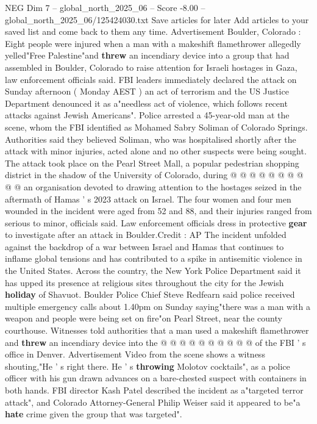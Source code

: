 \begin{textsample}{NEG Dim 7 – global\_north\_2025\_06 – Score -8.00 – global\_north\_2025\_06/125424030.txt}  \label{ex:f7_neg_080}
Save articles for later Add articles to your saved list and come back to them any time.
Advertisement Boulder, Colorado : Eight people were injured when a man with a makeshift flamethrower allegedly yelled"Free Palestine"and \textbf{threw} an incendiary device into a group that had assembled in Boulder, Colorado to raise attention for Israeli hostages in Gaza, law enforcement officials said.
FBI leaders immediately declared the attack on Sunday afternoon ( Monday AEST ) an act of terrorism and the US Justice Department denounced it as a"needless act of violence, which follows recent attacks against Jewish Americans".
Police arrested a 45-year-old man at the scene, whom the FBI identified as Mohamed Sabry Soliman of Colorado Springs.
Authorities said they believed Soliman, who was hospitalised shortly after the attack with minor injuries, acted alone and no other suspects were being sought.
The attack took place on the Pearl Street Mall, a popular pedestrian shopping district in the shadow of the University of Colorado, during @ @ @ @ @ @ @ @ @ @ an organisation devoted to drawing attention to the hostages seized in the aftermath of Hamas ' s 2023 attack on Israel.
The four women and four men wounded in the incident were aged from 52 and 88, and their injuries ranged from serious to minor, officials said.
Law enforcement officials dress in protective \textbf{gear} to investigate after an attack in Boulder.Credit : AP The incident unfolded against the backdrop of a war between Israel and Hamas that continues to inflame global tensions and has contributed to a spike in antisemitic violence in the United States.
Across the country, the New York Police Department said it has upped its presence at religious sites throughout the city for the Jewish \textbf{holiday} of Shavuot.
Boulder Police Chief Steve Redfearn said police received multiple emergency calls about 1.40pm on Sunday saying"there was a man with a weapon and people were being set on fire"on Pearl Street, near the county courthouse.
Witnesses told authorities that a man used a makeshift flamethrower and \textbf{threw} an incendiary device into the @ @ @ @ @ @ @ @ @ @ of the FBI ' s office in Denver.
Advertisement Video from the scene shows a witness shouting,"He ' s right there.
He ' s \textbf{throwing} Molotov cocktails", as a police officer with his gun drawn advances on a bare-chested suspect with containers in both hands.
FBI director Kash Patel described the incident as a"targeted terror attack", and Colorado Attorney-General Philip Weiser said it appeared to be"a \textbf{hate} crime given the group that was targeted".

\end{textsample}

